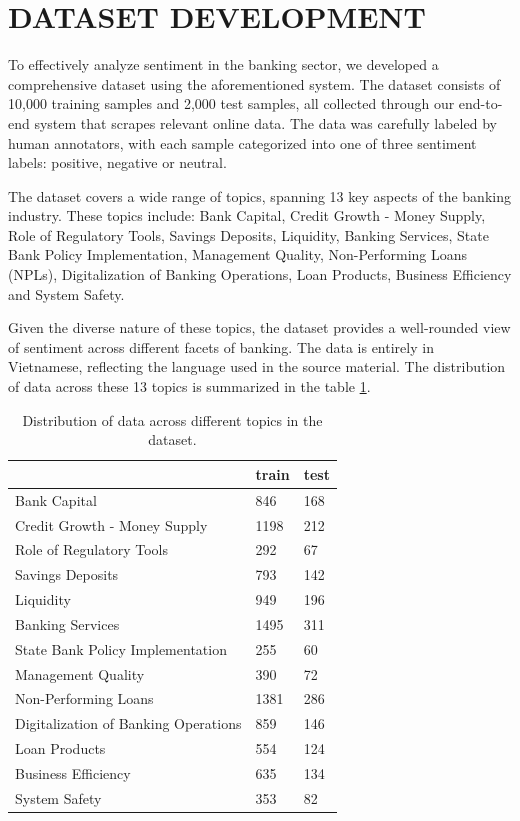 {\section{DATASET DEVELOPMENT}

To effectively analyze sentiment in the banking sector, we developed a comprehensive dataset using the aforementioned system. The dataset consists of 10,000 training samples and 2,000 test samples, all collected through our end-to-end system that scrapes relevant online data. The data was carefully labeled by human annotators, with each sample categorized into one of three sentiment labels: positive, negative or neutral.

The dataset covers a wide range of topics, spanning 13 key aspects of the banking industry. These topics include: Bank Capital, Credit Growth - Money Supply, Role of Regulatory Tools, Savings Deposits, Liquidity, Banking Services, State Bank Policy Implementation, Management Quality, Non-Performing Loans (NPLs), Digitalization of Banking Operations, Loan Products, Business Efficiency and System Safety.

Given the diverse nature of these topics, the dataset provides a well-rounded view of sentiment across different facets of banking. The data is entirely in Vietnamese, reflecting the language used in the source material. The distribution of data across these 13 topics is summarized in the table \ref{tab:topic_distribution}.

\begin{table}
  \begin{center}
    \begin{tabular}{|l|l|l|}
      \hline
       & \textbf{train} & \textbf{test}  \\ 
      \hline Bank Capital  & 846 & 168 \\ 
      \hline Credit Growth - Money Supply & 1198 & 212 \\ 
      \hline Role of Regulatory Tools  & 292 & 67  \\
      \hline Savings Deposits  & 793 & 142  \\
      \hline Liquidity  & 949 & 196  \\
      \hline Banking Services  & 1495 & 311  \\
      \hline State Bank Policy Implementation  & 255 & 60  \\
      \hline Management Quality  & 390 & 72  \\
      \hline Non-Performing Loans  & 1381 & 286  \\
      \hline Digitalization of Banking Operations  & 859 & 146  \\
      \hline Loan Products  & 554 & 124  \\
      \hline Business Efficiency  & 635 & 134  \\
      \hline System Safety  & 353 & 82  \\
      \hline
    \end{tabular}%
  \end{center}
  \caption{\small Distribution of data across different topics in the dataset.}
  \label{tab:topic_distribution}
\end{table}

}
